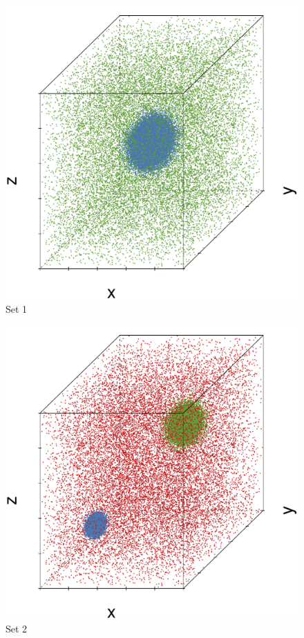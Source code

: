 \begin{subfigure}{0.18\textwidth}
	\centering
	\includegraphics[width=\textwidth]{3/img/datasetplot_ferdosi_1_60000.pdf}
	\caption{Set 1}
	\label{fig:3:simulated:datasets:ferdosi1}
\end{subfigure}
\begin{subfigure}{0.18\textwidth}
	\centering
	\includegraphics[width=\textwidth]{3/img/datasetplot_ferdosi_2_60000.pdf}
	\caption{Set 2}
	\label{fig:3:simulated:datasets:ferdosi2}
\end{subfigure}	
